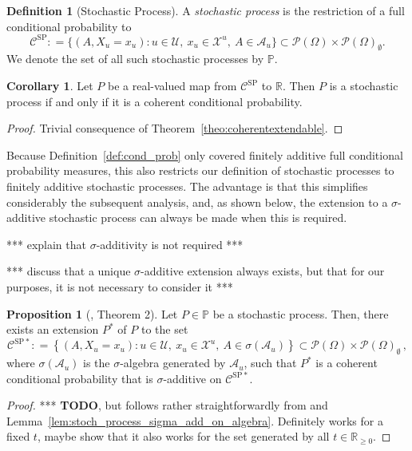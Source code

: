 \documentclass[10pt]{paper}
\theoremstyle{definition}
\newtheorem{proposition}[theorem]{Proposition}
\newtheorem{corollary}[theorem]{Corollary}
\newtheorem{definition}{Definition}
\newcommand{\reals}{\mathbb{R}}
\newcommand{\realsnonneg}{\reals_{\geq 0}}
\newcommand{\states}{\mathcal{X}}
\newcommand{\paths}{\Omega}
\newcommand{\power}{\mathcal{P}(\paths)}
\newcommand{\nonemptypower}{\power_{\emptyset}}
\newcommand{\processes}{\mathbb{P}}
\newcommand{\coloneqq}{:\!=}
\begin{document}
\begin{definition}[Stochastic Process]\label{def:stoch_process}
A \emph{stochastic process} is the restriction of a full conditional probability to
\begin{equation*}
\mathcal{C}^\mathrm{SP}\coloneqq\big\{
(A,X_u=x_u)
\colon
u\in\mathcal{U},~x_u\in\states^u,~A\in\mathcal{A}_u\big\}\subset\power\times\nonemptypower.
\end{equation*}
We denote the set of all such stochastic processes by $\processes$.
\end{definition}

\begin{corollary}
Let $P$ be a real-valued map from $\mathcal{C}^\mathrm{SP}$ to $\reals$. Then $P$ is a stochastic process if and only if it is a coherent conditional probability.
\end{corollary}
\begin{proof}
Trivial consequence of Theorem~\ref{theo:coherentextendable}.
\end{proof}

Because Definition~\ref{def:cond_prob} only covered finitely additive full conditional probability measures, this also restricts our definition of stochastic processes to finitely additive stochastic processes. The advantage is that this simplifies considerably the subsequent analysis, and, as shown below, the extension to a $\sigma$-additive stochastic process can always be made when this is required.

*** explain that $\sigma$-additivity is not required ***

*** discuss that a unique $\sigma$-additive extension always exists, but that for our purposes, it is not necessary to consider it ***

\begin{proposition}[\cite{berti2002coherent}, Theorem 2]
Let $P\in\processes$ be a stochastic process. Then, there exists an extension $P^*$ of $P$ to the set
\begin{equation*}
\mathcal{C}^{\mathrm{SP}*} \coloneqq \left\{(A,X_u=x_u)\colon
u\in\mathcal{U},~x_u\in\states^u,~A\in\sigma(\mathcal{A}_u)
\right\}\subset\power\times\nonemptypower\,,
\end{equation*}
where $\sigma(\mathcal{A}_u)$ is the $\sigma$-algebra generated by $\mathcal{A}_u$, such that $P^*$ is a coherent conditional probability that is $\sigma$-additive on $\mathcal{C}^{\mathrm{SP}*}$.
\end{proposition}
\begin{proof}
*** {\bf TODO}, but follows rather straightforwardly from \cite[Theorem 2]{berti2002coherent} and Lemma~\ref{lem:stoch_process_sigma_add_on_algebra}. Definitely works for a fixed $t$, maybe show that it also works for the set generated by all $t\in\realsnonneg$.
\end{proof}
\end{document}
